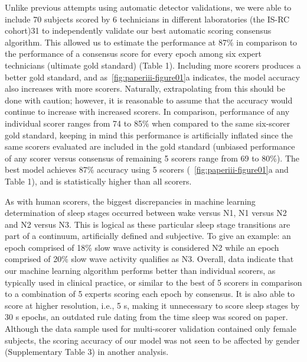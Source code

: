 Unlike previous attempts using automatic detector validations, we were able to include 70 subjects scored by 6 technicians in different laboratories (the IS-RC cohort)31 to independently validate our best automatic scoring consensus algorithm.
This allowed us to estimate the performance at 87\% in comparison to the performance of a consensus score for every epoch among six expert technicians (ultimate gold standard) (Table 1).
Including more scorers produces a better gold standard, and as~\cref{fig:paperiii-figure01}a indicates, the model accuracy also increases with more scorers.
Naturally, extrapolating from this should be done with caution; however, it is reasonable to assume that the accuracy would continue to increase with increased scorers.
In comparison, performance of any individual scorer ranges from 74 to 85\% when compared to the same six-scorer gold standard, keeping in mind this performance is artificially inflated since the same scorers evaluated are included in the gold standard (unbiased performance of any scorer versus consensus of remaining 5 scorers range from 69 to 80\%). 
The best model achieves 87\% accuracy using 5 scorers (~\cref{fig:paperiii-figure01}a and Table 1), and is statistically higher than all scorers.

As with human scorers, the biggest discrepancies in machine learning determination of sleep stages occurred between wake versus N1, N1 versus N2 and N2 versus N3.
This is logical as these particular sleep stage transitions are part of a continuum, artificially defined and subjective. To give an example: an epoch comprised of 18\% slow wave activity is considered N2 while an epoch comprised of 20\% slow wave activity qualifies as N3.
Overall, data indicate that our machine learning algorithm performs better than individual scorers, as typically used in clinical practice, or similar to the best of 5 scorers in comparison to a combination of 5 experts scoring each epoch by consensus.
It is also able to score at higher resolution, i.e., 5 s, making it unnecessary to score sleep stages by 30 s epochs, an outdated rule dating from the time sleep was scored on paper. 
Although the data sample used for multi-scorer validation contained only female subjects, the scoring accuracy of our model was not seen to be affected by gender (Supplementary Table 3) in another analysis.

